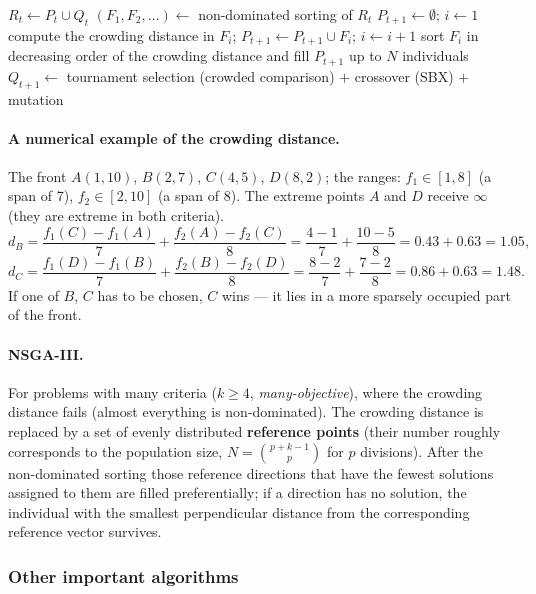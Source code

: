 \documentclass[11pt,a4paper]{article}
\theoremstyle{definition}
\begin{document}
\begin{algorithm}[!ht]
\caption{NSGA-II (one generation)}
\begin{algorithmic}[1]
\State $R_t \gets P_t \cup Q_t$ 
\State $(F_1, F_2, \dots) \gets$ non-dominated sorting of $R_t$
\State $P_{t+1} \gets \emptyset$; $i \gets 1$
  \State compute the crowding distance in $F_i$; $P_{t+1} \gets P_{t+1} \cup F_i$; $i \gets i+1$
\EndWhile
\State sort $F_i$ in decreasing order of the crowding distance and fill $P_{t+1}$ up to $N$ individuals
\State $Q_{t+1} \gets$ tournament selection (crowded comparison) $+$ crossover (SBX) $+$ mutation
\end{algorithmic}
\end{algorithm}

\paragraph{A numerical example of the crowding distance.} The front
$A(1,10)$, $B(2,7)$, $C(4,5)$, $D(8,2)$; the ranges: $f_1 \in [1,8]$
(a span of 7), $f_2 \in [2,10]$ (a span of 8). The extreme points $A$ and $D$
receive $\infty$ (they are extreme in both criteria).
\[
d_B = \frac{f_1(C)-f_1(A)}{7} + \frac{f_2(A)-f_2(C)}{8}
    = \frac{4-1}{7} + \frac{10-5}{8} = 0.43 + 0.63 = 1.05,
\]
\[
d_C = \frac{f_1(D)-f_1(B)}{7} + \frac{f_2(B)-f_2(D)}{8}
    = \frac{8-2}{7} + \frac{7-2}{8} = 0.86 + 0.63 = 1.48 .
\]
If one of $B$, $C$ has to be chosen, $C$ wins --- it lies in a more sparsely
occupied part of the front.

\paragraph{NSGA-III.} For problems with many criteria ($k \ge 4$,
\emph{many-objective}), where the crowding distance fails (almost everything is
non-dominated). The crowding distance is replaced by a set of evenly distributed
\textbf{reference points} (their number roughly corresponds to the population
size, $N = \binom{p+k-1}{p}$ for $p$ divisions). After the non-dominated sorting
those reference directions that have the fewest solutions assigned to them are
filled preferentially; if a direction has no solution, the individual with the
smallest perpendicular distance from the corresponding reference vector
survives.

\subsubsection{Other important algorithms}
\end{document}
